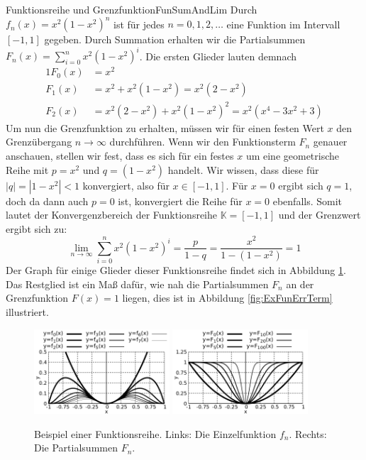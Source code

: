 \begin{example}{Funktionsreihe und Grenzfunktion}{FunSumAndLim}
    Durch $f_n(x) = x^2 (1-x^2)^n$ ist für jedes $n=0,1,2,\dots$ eine Funktion im Intervall $[-1,1]$ gegeben. Durch Summation erhalten wir die Partialsummen $F_n(x) = \sum\limits_{i=0}^n x^2 (1-x^2)^i$. Die ersten Glieder lauten demnach
    \begin{alignat*}{1}
        F_0(x) &= x^2 \\
        F_1(x) &= x^2 + x^2 (1-x^2) = x^2 (2-x^2) \\
        F_2(x) &= x^2 (2-x^2) + x^2 (1-x^2)^2 = x^2 (x^4-3x^2+3)
    \end{alignat*}
    Um nun die Grenzfunktion zu erhalten, müssen wir für einen festen Wert $x$ den Grenzübergang $n \to \infty$ durchführen. Wenn wir den Funktionsterm $F_n$ genauer anschauen, stellen wir fest, dass es sich für ein festes $x$ um eine geometrische Reihe mit $p=x^2$ und $q=(1-x^2)$ handelt. Wir wissen, dass diese für $|q|=|1-x^2|<1$ konvergiert, also für $x \in [-1,1]$. Für $x=0$ ergibt sich $q=1$, doch da dann auch $p=0$ ist, konvergiert die Reihe für $x=0$ ebenfalls. Somit lautet der Konvergenzbereich der Funktionsreihe $\mathbb{K} = [-1,1]$ und der Grenzwert ergibt sich zu:
    $$
        \lim\limits_{n\to\infty} \sum\limits_{i=0}^n x^2 (1-x^2)^i = \frac{p}{1-q} = \frac{x^2}{1-(1-x^2)} = 1
    $$
    Der Graph für einige Glieder dieser Funktionsreihe findet sich in Abbildung \ref{fig:ExFunSum}. Das Restglied ist ein Maß dafür, wie nah die Partialsummen $F_n$ an der Grenzfunktion $F(x) = 1$ liegen, dies ist in Abbildung \ref{fig:ExFunErrTerm} illustriert.
\end{example}

\begin{figure}
    \centering
    \includegraphics[width=0.45\textwidth]{./gnuplot/example-function-sum}
    \includegraphics[width=0.45\textwidth]{./gnuplot/example-function-sum-summed}
    \caption[Einzelfunktionen und Partialsummen einer Funktionsreihe]{Beispiel einer Funktionsreihe. Links: Die Einzelfunktion $f_n$. Rechts: Die Partialsummen $F_n$.}
    \label{fig:ExFunSum}
\end{figure}

